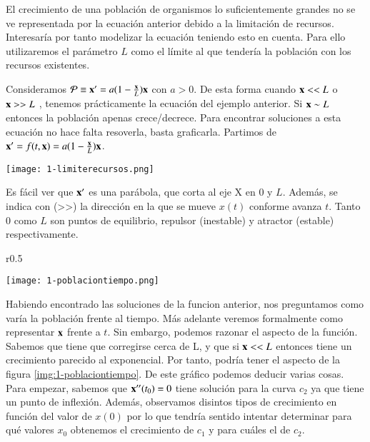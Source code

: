 El crecimiento de una población de organismos lo suficientemente grandes no se ve representada por la ecuación anterior debido a la limitación de recursos. Interesaría por tanto modelizar la ecuación teniendo esto en cuenta. Para ello utilizaremos el parámetro $L$ como el límite al que tendería la población con los recursos existentes.

\begin{eg}
    Consideramos $\mathcal{P} \equiv \mathbf{x'} = a(1-\frac{\mathbf{x}}{L})\mathbf{x}$ con $a > 0$. De esta forma cuando $\mathbf{x} << L$ o $\mathbf{x} >> L$ , tenemos prácticamente la ecuación del ejemplo anterior. Si $\mathbf{x} \sim L$ entonces la población apenas crece/decrece. Para encontrar soluciones a esta ecuación no hace falta resoverla, basta graficarla. Partimos de $\mathbf{x'} = f(t, \mathbf{x}) = a (1 - \frac{\mathbf{x}}{L})\mathbf{x}$.
    \\
    \begin{center}
        \texttt{[image: 1-limiterecursos.png]}\label{img:1-limiterecursos}
    \end{center}
    Es fácil ver que $\mathbf{x'}$ es una parábola, que corta al eje X en $0$ y $L$. Además, se indica con (>>) la dirección en la que se mueve $x(t)$ conforme avanza $t$. Tanto $0$ como $L$ son puntos de equilibrio, repulsor (inestable) y atractor (estable) respectivamente.
\end{eg}
\break

\begin{wrapfigure}{r}{0.5\textwidth}
  \begin{center}
    \texttt{[image: 1-poblaciontiempo.png]}
  \end{center}
  \caption{Población - Tiempo}\label{img:1-poblaciontiempo}
\end{wrapfigure}
Habiendo encontrado las soluciones de la funcion anterior, nos preguntamos como varía la población frente al tiempo. Más adelante veremos formalmente como representar $\mathbf{x}$ frente a $t$. Sin embargo, podemos razonar el aspecto de la función.
Sabemos que tiene que corregirse cerca de L, y que si $\mathbf{x} << L$ entonces tiene un crecimiento parecido al exponencial. Por tanto, podría tener el aspecto de la figura \ref{img:1-poblaciontiempo}.
De este gráfico podemos deducir varias cosas. Para empezar, sabemos que $\mathbf{x''}(t_0)=0$ tiene solución para la curva $c_2$ ya que tiene un punto de inflexión. Además, observamos disintos tipos de crecimiento en función del valor de $x(0)$ por lo que tendría sentido intentar determinar para qué valores $x_0$ obtenemos el crecimiento de $c_1$ y para cuáles el de $c_2$.

